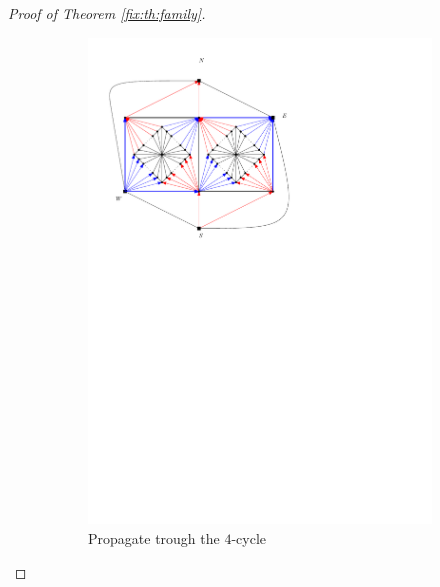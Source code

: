 \begin{proof}[Proof of Theorem \ref{fix:th:family}]
\begin{figure}[h]
\begin{subfigure}[t]{0.3\textwidth}
      \includegraphics[width=\textwidth]{fixExtension/img/manymany2}
      \caption{Propagate trough the $4$-cycle}
      \label{fig:fix:manymany2}
    \end{subfigure}
    \quad
    \begin{subfigure}[t]{0.3\textwidth}

\end{subfigure}
\end{figure}
\end{proof}
